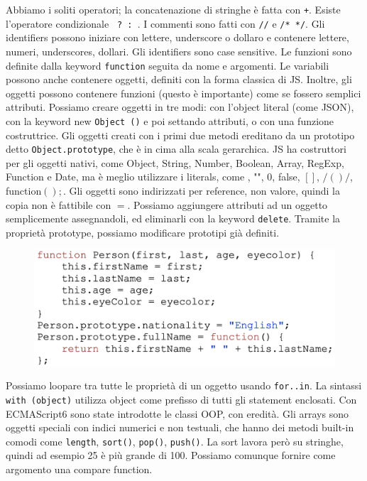 \documentclass[11pt]{article}
\newcommand{\code}[1]{\texttt{#1}}
\begin{document}
Abbiamo i soliti operatori; la concatenazione di stringhe è fatta con \code{+}. Esiste l'operatore condizionale \code{ ? : }. I commenti sono fatti con \code{//} e \code{/* */}. Gli identifiers possono iniziare con lettere, underscore o dollaro e contenere lettere, numeri, underscores, dollari. Gli identifiers sono case sensitive. Le funzioni sono definite dalla keyword \code{function} seguita da nome e argomenti. Le variabili possono anche contenere oggetti, definiti con la forma classica di JS. Inoltre, gli oggetti possono contenere funzioni (questo è importante) come se fossero semplici attributi. Possiamo creare oggetti in tre modi: con l'object literal (come JSON), con la keyword new \code{Object ()} e poi settando attributi, o con una funzione costruttrice. Gli oggetti creati con i primi due metodi ereditano da un prototipo detto \code{Object.prototype}, che è in cima alla scala gerarchica. JS ha costruttori per gli oggetti nativi, come Object, String, Number, Boolean, Array, RegExp, Function e Date, ma è meglio utilizzare i literals, come \textbraceleft\textbraceright, "", 0, false, $[]$, $/()/$, function$(){};$. Gli oggetti sono indirizzati per reference, non valore, quindi la copia non è fattibile con $=$. Possiamo aggiungere attributi ad un oggetto semplicemente assegnandoli, ed eliminarli con la keyword \code{delete}. Tramite la proprietà prototype, possiamo modificare prototipi già definiti. 
\begin{figure}[H]
    \centering
    \includegraphics[width=0.4\linewidth]{res/prototype.png}
\end{figure}
Possiamo loopare tra tutte le proprietà di un oggetto usando \code{for..in}.
La sintassi \code{with (object)${}$} utilizza object come prefisso di tutti gli statement enclosati. Con ECMAScript6 sono state introdotte le classi OOP, con eredità. Gli arrays sono oggetti speciali con indici numerici e non testuali, che hanno dei metodi built-in comodi come \code{length}, \code{sort()}, \code{pop()}, \code{push()}. La sort lavora però su stringhe, quindi ad esempio 25 è più grande di 100. Possiamo comunque fornire come argomento una compare function. 
\end{document}
